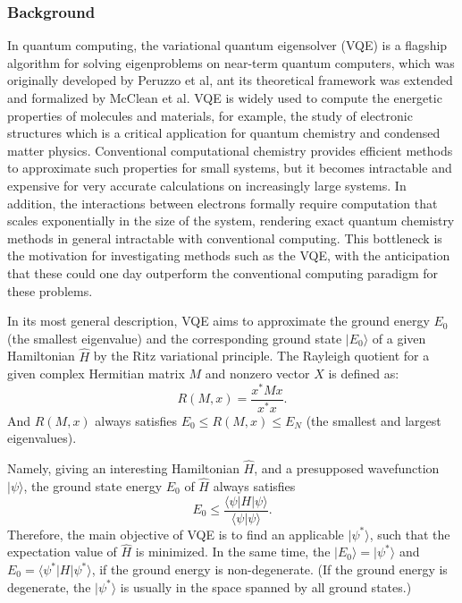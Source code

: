 
\subsubsection{Background}

In quantum computing, the variational quantum eigensolver (VQE) is a flagship algorithm for solving eigenproblems on near-term quantum computers, which was originally developed by Peruzzo et al, ant its theoretical framework was extended and formalized by McClean et al.
VQE is widely used to compute the energetic properties of molecules and materials, for example, the study of electronic structures which is a critical application for quantum chemistry and condensed matter physics.
Conventional computational chemistry provides efficient methods to approximate such properties for small systems, but it becomes intractable and expensive for very accurate calculations on increasingly large systems. In addition, the interactions between electrons formally require computation that scales exponentially in the size of the system, rendering exact quantum chemistry methods in general intractable with conventional computing.
This bottleneck is the motivation for investigating methods such as the VQE, with the anticipation that these could one day outperform the conventional computing paradigm for these problems.

In its most general description, VQE aims to approximate the ground energy $E_0$ (the smallest eigenvalue) and the corresponding ground state $|E_0\rangle$ of a given Hamiltonian $\hat{H}$ by the Ritz variational principle.
The Rayleigh quotient for a given complex Hermitian matrix $M$ and nonzero vector $X$ is defined as:
\begin{equation}
    R(M,x)=\frac{x^*Mx}{x^*x}.
\end{equation}
And $R(M,x)$ always satisfies $E_0\leq R(M,x)\leq E_N$ (the smallest and largest eigenvalues).

Namely, giving an interesting Hamiltonian $\hat{H}$, and a presupposed wavefunction $|\psi\rangle$, the ground state energy $E_{0}$ of $\hat{H}$ always satisfies
\begin{equation}
    E_0 \leq \frac{\langle \psi |H| \psi \rangle}{\langle \psi |\psi\rangle}.
\end{equation}
Therefore, the main objective of VQE is to find an applicable $|\psi^*\rangle$, such that the expectation value of $\hat{H}$ is minimized. In the same time, the $|E_0\rangle = |\psi^*\rangle$ and $E_0 = \langle \psi^* |H| \psi^* \rangle$, if the ground energy is non-degenerate. (If the ground energy is degenerate, the $|\psi^*\rangle$ is usually in the space spanned by all ground states.)

